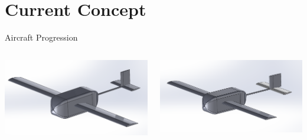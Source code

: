 \documentclass{beamer}
\newcommand{\setpresentername}[1]{\renewcommand{\presentername}{#1}}
\newcommand{\setpresentertitle}[1]{\renewcommand{\presentertitle}{#1}}
\newcommand{\presentername}{}
\newcommand{\presentertitle}{}
\begin{document}
    \section{Current Concept}
    \setpresentername{Bradley Nordwall}
    \setpresentertitle{Lead CAD Engineer}
    \begin{frame}{Aircraft Progression}
        \begin{columns}[T]
            \begin{column}{0.5\textwidth}
                \centering
                \includegraphics[width=\textwidth]{figures/isometrics over time/Assem1.0.1Iso.png}
                \vspace{0.5em} %
            \end{column}
    
            \begin{column}{0.5\textwidth}
                \centering
                \includegraphics[width=\textwidth]{figures/isometrics over time/Assem1.1.12Iso.png}
                \vspace{0.5em} %
            \end{column}
        \end{columns}
    

\end{frame}
\end{document}
